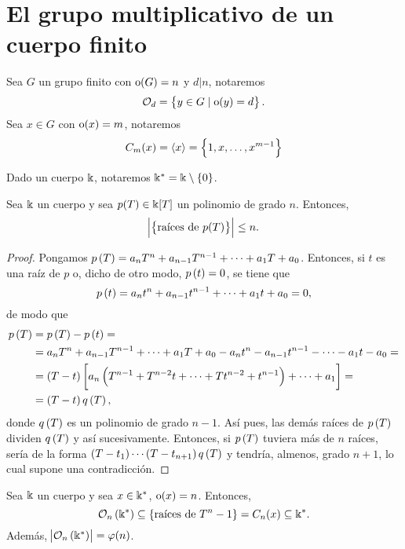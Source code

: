 \section{El grupo multiplicativo de un cuerpo finito}

\begin{obs}[Notación]
    Sea $G$ un grupo finito con $\operatorname{o}(G) = n$ y $d \vert n$, notaremos
    \[
        \mathcal{O}_d = \left\{y \in G \mid \operatorname{o}(y) = d\right\}.
    \]
    Sea $x \in G$ con $\operatorname{o}(x) = m$, notaremos
    \[
        C_m(x) = \langle x \rangle = \left\{1, x, \dots, x^{m-1}\right\}
    \]
\end{obs}

\begin{obs}[Notación]
    Dado un cuerpo $\Bbbk$, notaremos $\Bbbk^\ast = \Bbbk \setminus \left\{0\right\}$.
\end{obs}

\begin{lema}
    Sea $\Bbbk$ un cuerpo y sea $p(T) \in \Bbbk[T]$ un polinomio de grado $n$. Entonces,
    \[
        \abs{\left\{\text{raíces de } p(T)\right\}} \leq n.
    \]
\end{lema}
\begin{proof}
    Pongamos $p\left( T\right) = a_nT^n+a_{n-1}T^{n-1}+\cdots+a_1T+a_0$. Entonces, si $t$ es una raíz de $p$ o, dicho de otro modo, $p\left( t\right) = 0$, se tiene que
    \[
        p\left( t\right) = a_nt^n+a_{n-1}t^{n-1}+\cdots+a_1t+a_0=0,
    \]
    de modo que
    \begin{align*}
        p\left( T\right) &= p\left( T\right) - p\left( t\right) =\\
        &= a_nT^n+a_{n-1}T^{n-1}+\cdots+a_1T+a_0-a_nt^n-a_{n-1}t^{n-1}-\cdots-a_1t-a_0=\\
        &= \left( T-t\right)\left[ a_n\left( T^{n-1} + T^{n-2}t+ \cdots +Tt^{n-2} +t^{n-1}\right) + \cdots+ a_1\right]=\\
        &= \left( T-t\right) q\left( T\right),
    \end{align*}
    donde $q\left( T\right)$ es un polinomio de grado $n-1$. Así pues, las demás raíces de $p\left( T\right)$ dividen $q\left( T\right)$ y así sucesivamente. Entonces, si $p\left( T\right)$ tuviera más de $n$ raíces, sería de la forma $\left( T-t_1\right) \cdots \left( T-t_{n+1}\right) q\left( T\right)$ y tendría, almenos, grado $n+1$, lo cual supone una contradicción.
\end{proof}

\begin{lema}
    Sea $\Bbbk$ un cuerpo y sea $x \in \Bbbk^\ast$, $\operatorname{o}(x) = n$. Entonces,
    \[
        \mathcal{O}_n\left( \Bbbk^\ast \right) \subseteq \left\{ \text{raíces de } T^n -1\right\}
        = C_n(x) \subseteq \Bbbk^\ast.
    \]
    Además, $\abs{\mathcal{O}_n\left( \Bbbk^\ast \right)} = \varphi(n)$.
\end{lema}

